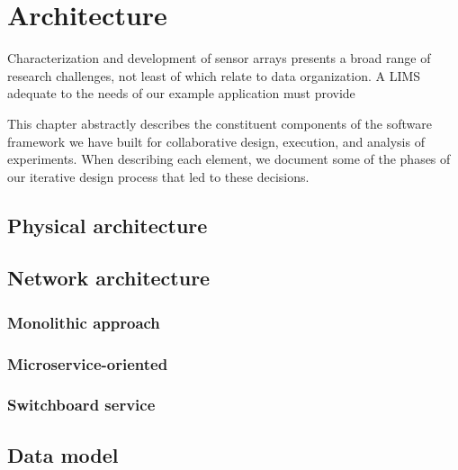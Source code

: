 \documentclass[../thesis]{subfiles}
\begin{document}
\chapter{Architecture}
Characterization and development of sensor arrays presents a broad
range of research challenges, not least of which relate to data
organization. A \gls{LIMS} adequate to the needs of our example
application must provide

This chapter abstractly describes the constituent components
of the software framework we have built for collaborative design,
execution, and analysis of experiments. When describing each
element, we document some of the phases of our iterative design
process that led to these decisions.

\section{Physical architecture}

\section{Network architecture}

\subsection{Monolithic approach}

\subsection{Microservice-oriented}

\subsection{Switchboard service}

\section{Data model}
\end{document}

